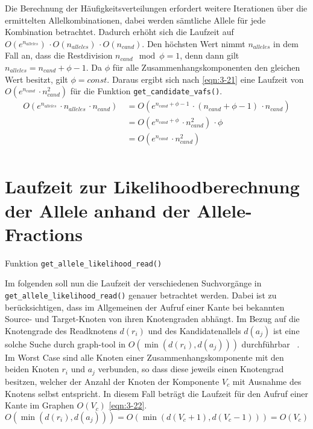 Die Berechnung der Häufigkeitsverteilungen erfordert weitere Iterationen über die ermittelten Allelkombinationen, dabei werden sämtliche Allele für jede Kombination betrachtet. Dadurch erhöht sich die Laufzeit auf $ O(e^{n_{alleles}})\, \cdotp O(n_{alleles}) \, \cdotp O(n_{cand}) $. Den höchsten Wert nimmt $ n_{alleles} $ in dem Fall an, dass die Restdivision $ n_{cand} \mod \phi = 1 $, denn dann gilt  $ n_{alleles} = n_{cand} + \phi - 1 $. Da $\phi$ für alle Zusammenhangskomponenten den gleichen Wert besitzt, gilt $\phi = const$. Daraus ergibt sich nach \eqref{eqn:3-21} eine Laufzeit von $ O(e^{n_{cand}}\, \cdotp n_{cand}^2) $ für die Funktion  \lstinline|get_candidate_vafs()|.
\begin{equation} \label{eqn:3-21}
\tag{3-21}
\begin{aligned}
O(e^{n_{alleles}} \, \cdotp n_{alleles} \, \cdotp n_{cand}) 
&\ {}= O(e^{n_{cand} + \phi - 1} \, \cdotp (n_{cand} + \phi - 1) \, \cdotp n_{cand})\\
&\ = O(e^{n_{cand} + \phi}\, \cdotp n_{cand}^2) \, \cdotp \phi\\
&\ = O(e^{n_{cand}}\, \cdotp n_{cand}^2)\\
\end{aligned}
\end{equation} 

\section{Laufzeit zur Likelihoodberechnung der Allele anhand der Allele-Fractions}

Funktion \lstinline|get_allele_likelihood_read()|

Im folgenden soll nun die Laufzeit der verschiedenen Suchvorgänge in \linebreak \lstinline|get_allele_likelihood_read()| genauer betrachtet werden. Dabei ist zu berücksichtigen, dass im Allgemeinen der Aufruf einer Kante bei bekannten Source- und Target-Knoten von ihren Knotengraden abhängt. Im Bezug auf die Knotengrade des Readknotens $d(r_{i}) $  und des Kandidatenallels $d(a_{j}) $ ist eine solche Suche durch graph-tool in $O(\min (d(r_{i}), d(a_{j})))$ durchführbar ~\cite{docs_graph_tool}. Im Worst Case sind alle Knoten einer Zusammenhangskomponente mit den beiden Knoten $r_{i}$ und $a_{j}$ verbunden, so dass diese jeweils einen Knotengrad besitzen, welcher der Anzahl der Knoten der Komponente $V_{c}$ mit Ausnahme des Knotens selbst entspricht. In diesem Fall beträgt die Laufzeit für den Aufruf einer Kante im Graphen $ O(V_{c}) $ \eqref{eqn:3-22}.
\begin{equation} \label{eqn:3-22}
\tag{3-22}
O(\min (d(r_{i}), d(a_{j}))) =O(\min (d(V_{c}+1), d(V_{c}-1)))= O(V_{c})
\end{equation} 

